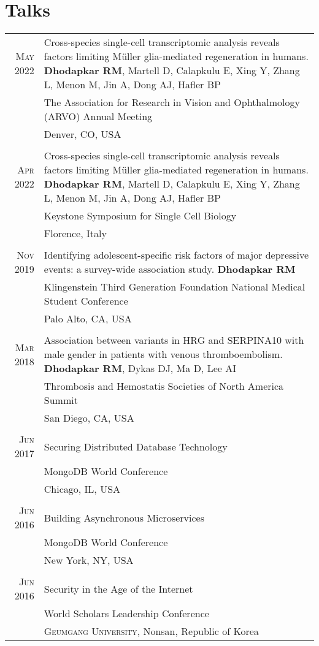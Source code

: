 \documentclass[a4paper,10pt]{article}
\begin{document}
\section{Talks}
\begin{tabular}{rp{11cm}}

 \textsc{May} 2022 & Cross-species single-cell transcriptomic analysis reveals factors limiting Müller glia-mediated regeneration in humans. {\bf Dhodapkar RM}, Martell D, Calapkulu E, Xing Y, Zhang L, Menon M, Jin A, Dong AJ, Hafler BP \\
 								 & The Association for Research in Vision and Ophthalmology (ARVO) Annual Meeting \\
 								 & Denver, CO, USA  \\
 \multicolumn{2}{c}{} \\
 \textsc{Apr} 2022 & Cross-species single-cell transcriptomic analysis reveals factors limiting Müller glia-mediated regeneration in humans. {\bf Dhodapkar RM}, Martell D, Calapkulu E, Xing Y, Zhang L, Menon M, Jin A, Dong AJ, Hafler BP\\
 								 & Keystone Symposium for Single Cell Biology \\
 								 & Florence, Italy  \\
 \multicolumn{2}{c}{} \\
 \textsc{Nov} 2019 & Identifying adolescent-specific risk factors of major depressive events: a survey-wide association study. {\bf Dhodapkar RM} \\
 								 & Klingenstein Third Generation Foundation National Medical Student Conference \\
 								 & Palo Alto, CA, USA  \\
 \multicolumn{2}{c}{} \\
 \textsc{Mar} 2018 & Association between variants in HRG and SERPINA10 with male gender in patients with venous thromboembolism.
 {\bf Dhodapkar RM},  Dykas DJ,  Ma D,  Lee AI \\
 								 & Thrombosis and Hemostatis Societies of North America Summit \\
 								 & San Diego, CA, USA  \\
 \multicolumn{2}{c}{} \\
 \textsc{Jun} 2017 & Securing Distributed Database Technology \\
 								 & MongoDB World Conference\\
 								 & Chicago, IL, USA  \\
 \multicolumn{2}{c}{} \\
 \textsc{Jun} 2016 & Building Asynchronous Microservices \\
 								 & MongoDB World Conference\\
 								 & New York, NY, USA  \\
 \multicolumn{2}{c}{} \\
 \textsc{Jun} 2016 & Security in the Age of the Internet\\
 							    &  World Scholars Leadership Conference\\
 							    &  \textsc{Geumgang University}, Nonsan, Republic of Korea \\
\end{tabular}
\end{document}
